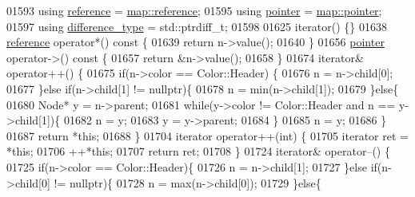 \begin{DoxyCode}
01593         \textcolor{keyword}{using} \hyperlink{classaed2_1_1map_af4f147533b3c0207ab036c86ce13ec0d_af4f147533b3c0207ab036c86ce13ec0d}{reference} = \hyperlink{classaed2_1_1map_af4f147533b3c0207ab036c86ce13ec0d_af4f147533b3c0207ab036c86ce13ec0d}{map::reference};
01595         \textcolor{keyword}{using} \hyperlink{classaed2_1_1map_a7394e98a23b86bc008ad73326b273fd5_a7394e98a23b86bc008ad73326b273fd5}{pointer} = \hyperlink{classaed2_1_1map_a7394e98a23b86bc008ad73326b273fd5_a7394e98a23b86bc008ad73326b273fd5}{map::pointer};
01597         \textcolor{keyword}{using} \hyperlink{classaed2_1_1map_a2f55b88809000fcbfce1c6cfef1ba74d_a2f55b88809000fcbfce1c6cfef1ba74d}{difference\_type} = std::ptrdiff\_t;
01598 
01625         iterator() \{\}
01638         \hyperlink{classaed2_1_1map_af4f147533b3c0207ab036c86ce13ec0d_af4f147533b3c0207ab036c86ce13ec0d}{reference} operator*()\textcolor{keyword}{ const }\{
01639             \textcolor{keywordflow}{return} n->value();
01640         \}
01656         \hyperlink{classaed2_1_1map_a7394e98a23b86bc008ad73326b273fd5_a7394e98a23b86bc008ad73326b273fd5}{pointer} operator->()\textcolor{keyword}{ const }\{
01657             \textcolor{keywordflow}{return} &n->value();
01658         \}
01674         iterator& operator++() \{
01675             \textcolor{keywordflow}{if}(n->color == Color::Header) \{
01676                 n = n->child[0];
01677             \}\textcolor{keywordflow}{else} \textcolor{keywordflow}{if}(n->child[1] != \textcolor{keyword}{nullptr})\{
01678                 n = min(n->child[1]);
01679             \}\textcolor{keywordflow}{else}\{
01680                 Node* y = n->parent;
01681                 \textcolor{keywordflow}{while}(y->color != Color::Header and n == y->child[1])\{
01682                     n = y;
01683                     y = y->parent;
01684                 \}
01685                 n = y;
01686             \}
01687             \textcolor{keywordflow}{return} *\textcolor{keyword}{this};
01688         \}
01704         iterator operator++(\textcolor{keywordtype}{int}) \{
01705             iterator ret = *\textcolor{keyword}{this};
01706             ++*\textcolor{keyword}{this};
01707             \textcolor{keywordflow}{return} ret;
01708         \}
01724         iterator& operator--() \{
01725             \textcolor{keywordflow}{if}(n->color == Color::Header)\{
01726                 n = n->child[1];
01727             \}\textcolor{keywordflow}{else} \textcolor{keywordflow}{if}(n->child[0] != \textcolor{keyword}{nullptr})\{
01728                 n = max(n->child[0]);
01729             \}\textcolor{keywordflow}{else}\{

\end{DoxyCode}

